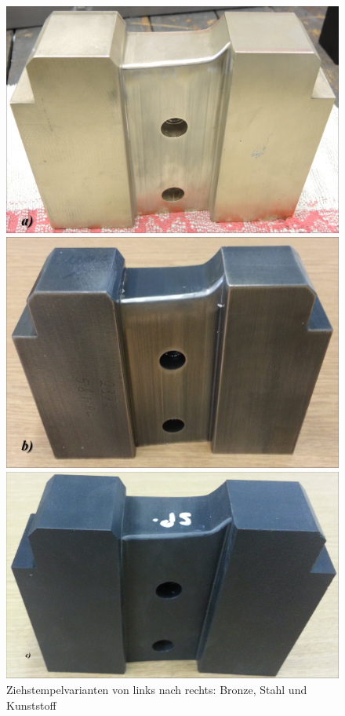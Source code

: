 \documentclass[12pt,a4paper,parskip]{scrartcl}
\begin{document}
\begin{figure}[H]
\centering
\begin{minipage}[t]{0.3\textwidth}
\includegraphics[width=.9\textwidth]{punchbronze}
\end{minipage}
\begin{minipage}[t]{0.3\textwidth}
\includegraphics[width=.9\textwidth]{punchstahl}
\end{minipage}
\begin{minipage} [t]{0.329\textwidth}
\includegraphics[width=.9\textwidth]{punchkunst}

\end{minipage}
\caption{Ziehstempelvarianten von links nach rechts: Bronze, Stahl und Kunststoff}
\label{fig:punchvar}
\end{figure}
\end{document}
